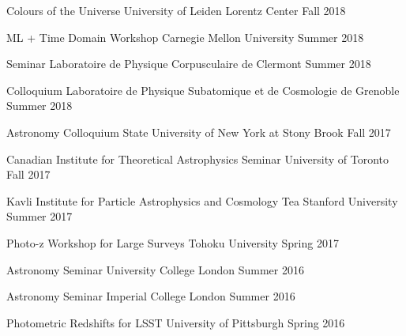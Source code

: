\documentclass[12pt,letterpaper]{article}
\begin{document}
\begin{list}{}{\malzlist}
	{Colours of the Universe}
	{University of Leiden Lorentz Center}
	{Fall 2018}
\item {}
  {ML + Time Domain Workshop}
	{Carnegie Mellon University}
	{Summer 2018}
\item {}
  {Seminar}
	{Laboratoire de Physique Corpusculaire de Clermont}
	{Summer 2018}
\item {}
  {Colloquium}
	{Laboratoire de Physique Subatomique et de Cosmologie de Grenoble}
	{Summer 2018}
\item {}
  {Astronomy Colloquium}
	{State University of New York at Stony Brook}
	{Fall 2017}
\item {}
  {Canadian Institute for Theoretical Astrophysics Seminar}
	{University of Toronto}
	{Fall 2017}
\item {}
  {Kavli Institute for Particle Astrophysics and Cosmology Tea}
	{Stanford University}
	{Summer 2017}
\item {}
  {Photo-z Workshop for Large Surveys}
	{Tohoku University}
	{Spring 2017}
\item {}
  {Astronomy Seminar}
	{University College London}
	{Summer 2016}
\item {}
  {Astronomy Seminar}
	{Imperial College London}
	{Summer 2016}
\item {}
  {Photometric Redshifts for LSST}
	{University of Pittsburgh}
	{Spring 2016}
\end{list}
\end{document}
